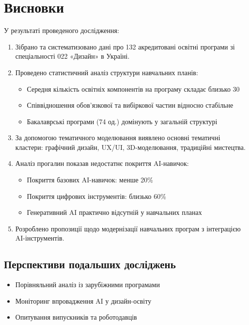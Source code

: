 \chapter{Висновки}

У результаті проведеного дослідження:

\begin{enumerate}
    \item Зібрано та систематизовано дані про 132 акредитовані освітні програми
    зі спеціальності 022 «Дизайн» в Україні.

    \item Проведено статистичний аналіз структури навчальних планів:
    \begin{itemize}
        \item Середня кількість освітніх компонентів на програму складає близько 30
        \item Співвідношення обов'язкової та вибіркової частин відносно стабільне
        \item Бакалаврські програми (74 од.) домінують у загальній структурі
    \end{itemize}

    \item За допомогою тематичного моделювання виявлено основні тематичні кластери:
    графічний дизайн, UX/UI, 3D-моделювання, традиційні мистецтва.

    \item Аналіз прогалин показав недостатнє покриття AI-навичок:
    \begin{itemize}
        \item Покриття базових AI-навичок: менше 20\%
        \item Покриття цифрових інструментів: близько 60\%
        \item Генеративний AI практично відсутній у навчальних планах
    \end{itemize}

    \item Розроблено пропозиції щодо модернізації навчальних програм
    з інтеграцією AI-інструментів.
\end{enumerate}

\section{Перспективи подальших досліджень}

\begin{itemize}
    \item Порівняльний аналіз із зарубіжними програмами
    \item Моніторинг впровадження AI у дизайн-освіту
    \item Опитування випускників та роботодавців
\end{itemize}
